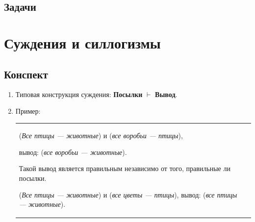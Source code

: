 \subsection{Задачи}



\section{Суждения и силлогизмы}

\subsection{Конспект}
\begin{enumerate}\setlength{\itemsep}{1pt}
\item Типовая конструкция суждения: \textbf{Посылки} $\vdash$ \textbf{Вывод}.
\item Пример:

\begin{tabular}{lr}
\begin{minipage}[b]{0.6\linewidth}
(\textit{Все птицы --- животные}) и (\textit{все воробьи --- птицы}),

вывод: (\textit{все воробьи --- животные}).

Такой вывод является правильным независимо от того, правильные ли посылки.

(\textit{Все птицы --- животные}) и (\textit{все цветы --- птицы}), вывод: (\textit{все птицы --- животные}).


\end{minipage}
\end{tabular}
\end{enumerate}
